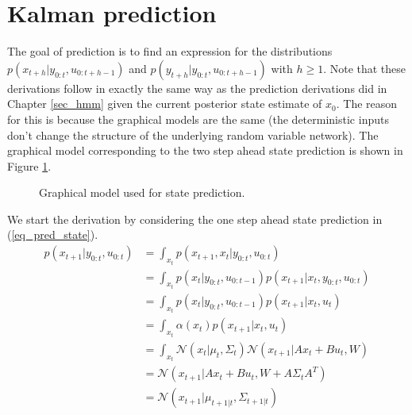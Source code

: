\section{Kalman prediction}
\label{sec_lin_prediction}
The goal of prediction is to find an expression for the distributions $p(x_{t+h}|y_{0:t}, u_{0:t+h-1})$ and $p(y_{t+h}|y_{0:t}, u_{0:t+h-1})$ with $h\geq 1$. Note that these derivations follow in exactly the same way as the prediction derivations did in Chapter \ref{sec_hmm} given the current posterior state estimate of $x_0$. The reason for this is because the graphical models are the same (the deterministic inputs don't change the structure of the underlying random variable network). The graphical model corresponding to  the two step ahead state prediction is shown in Figure \ref{fig_gm_linmods_prediction}.
\begin{figure}[H] 
\centering
{}
\caption{Graphical model used for state prediction.}
\label{fig_gm_linmods_prediction}
\end{figure} 
We start the derivation by considering the one step ahead state prediction in (\ref{eq_pred_state}).
\begin{equation}
\begin{aligned}
p(x_{t+1}|y_{0:t}, u_{0:t}) &= \int_{x_t} p(x_{t+1},x_t|y_{0:t}, u_{0:t}) \\
&= \int_{x_t} p(x_t|y_{0:t}, u_{0:t-1}) p(x_{t+1}|x_t,y_{0:t}, u_{0:t}) \\
&= \int_{x_t} p(x_t|y_{0:t}, u_{0:t-1}) p(x_{t+1}|x_t, u_{t}) \\
&= \int_{x_t} \alpha(x_t) p(x_{t+1}|x_t, u_{t}) \\
&= \int_{x_t} \mathcal{N}(x_t|\mu_t, \Sigma_t) \mathcal{N}(x_{t+1}|Ax_t+Bu_t, W) \\
&= \mathcal{N}(x_{t+1}|Ax_t+Bu_t, W+A\Sigma_t A^T) \\
&= \mathcal{N}(x_{t+1}|\mu_{t+1|t}, \Sigma_{t+1|t})
\end{aligned}
\label{eq_pred_state}
\end{equation}
